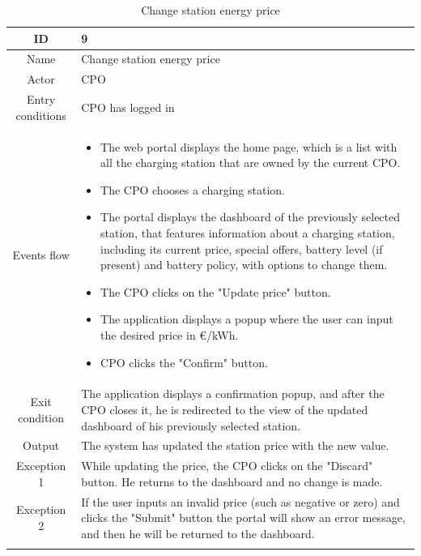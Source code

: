\begin{longtable}{|c| p{10cm}|}
    \hline ID        & 9\\
    \hline
    Name     & Change station energy price \\
    \hline
    Actor            & CPO\\
    \hline
    Entry conditions & CPO has logged in \\
    \hline
    Events flow      & \begin{itemize}[nosep,after=\strut]
        \item The web portal displays the home page, which is a list with all the charging station that are owned by the current CPO.
        \item The CPO chooses a charging station.
        \item The portal displays the dashboard of the previously selected station, that features information about a charging station, including its current price, special offers, battery level (if present) and battery policy, with options to change them.
        \item The CPO clicks on the "Update price" button.
        \item The application displays a popup where the user can input the desired price in €/kWh.
        \item CPO clicks the "Confirm" button.
    \end{itemize}\\
    \hline
    Exit condition   & The application displays a confirmation popup, and after the CPO closes it, he is redirected to the view of the updated dashboard of his previously selected station.\\
    \hline
    Output           & The system has updated the station price with the new value. 
    \\
    \hline
    \hline
    Exception 1      &  While updating the price, the CPO clicks on the "Discard" button. He returns to the dashboard and no change is made. \\
    \hline
    Exception 2     & If the user inputs an invalid price (such as negative or zero) and clicks the "Submit" button the portal will show an error message, and then he will be returned to the dashboard.
    \\
    \hline
    \caption{Change station energy price}\\
\end{longtable}
